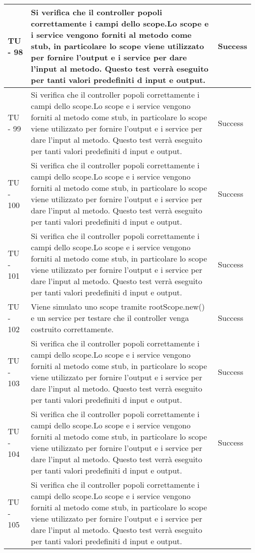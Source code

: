 \begin{center}
\begin{longtable}{ | p{3cm} | p{9cm} | p{2cm} | }
TU - 98 & Si verifica che il controller popoli correttamente i campi dello scope.Lo scope e i service vengono forniti al metodo come stub, in particolare lo scope viene utilizzato per fornire l'output e i service per dare l'input al metodo. Questo test verrà eseguito per tanti valori predefiniti d input e output.
 & Success \\ \hline
TU - 99 & Si verifica che il controller popoli correttamente i campi dello scope.Lo scope e i service vengono forniti al metodo come stub, in particolare lo scope viene utilizzato per fornire l'output e i service per dare l'input al metodo. Questo test verrà eseguito per tanti valori predefiniti d input e output. & Success \\ \hline
TU - 100 & Si verifica che il controller popoli correttamente i campi dello scope.Lo scope e i service vengono forniti al metodo come stub, in particolare lo scope viene utilizzato per fornire l'output e i service per dare l'input al metodo. Questo test verrà eseguito per tanti valori predefiniti d input e output. & Success \\ \hline
TU - 101 & Si verifica che il controller popoli correttamente i campi dello scope.Lo scope e i service vengono forniti al metodo come stub, in particolare lo scope viene utilizzato per fornire l'output e i service per dare l'input al metodo. Questo test verrà eseguito per tanti valori predefiniti d input e output. & Success \\ \hline
TU - 102 & Viene simulato uno scope tramite rootScope.new() e un service per testare che il controller venga costruito correttamente.
 & Success \\ \hline
TU - 103 & Si verifica che il controller popoli correttamente i campi dello scope.Lo scope e i service vengono forniti al metodo come stub, in particolare lo scope viene utilizzato per fornire l'output e i service per dare l'input al metodo. Questo test verrà eseguito per tanti valori predefiniti d input e output.
 & Success \\ \hline
TU - 104 & Si verifica che il controller popoli correttamente i campi dello scope.Lo scope e i service vengono forniti al metodo come stub, in particolare lo scope viene utilizzato per fornire l'output e i service per dare l'input al metodo. Questo test verrà eseguito per tanti valori predefiniti d input e output.
 & Success \\ \hline
TU - 105 & Si verifica che il controller popoli correttamente i campi dello scope.Lo scope e i service vengono forniti al metodo come stub, in particolare lo scope viene utilizzato per fornire l'output e i service per dare l'input al metodo. Questo test verrà eseguito per tanti valori predefiniti d input e output.

\end{longtable}
\end{center}
